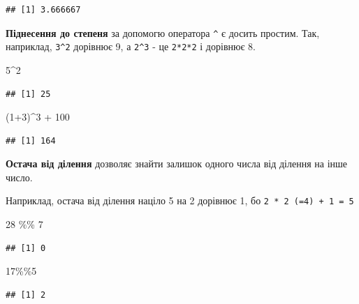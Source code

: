 \documentclass[
]{book}
\newenvironment{Shaded}{\begin{snugshade}}{\end{snugshade}}
\newcommand{\DecValTok}[1]{\textcolor[rgb]{0.00,0.00,0.81}{#1}}
\newcommand{\NormalTok}[1]{#1}
\newcommand{\SpecialCharTok}[1]{\textcolor[rgb]{0.00,0.00,0.00}{#1}}
\begin{document}
\begin{verbatim}
## [1] 3.666667
\end{verbatim}

\textbf{Піднесення до степеня} за допомогю оператора \texttt{\^{}} є досить простим. Так, наприклад, \texttt{3\^{}2} дорівнює 9, а \texttt{2\^{}3} - це \texttt{2*2*2} і дорівнює 8.

\begin{Shaded}
\begin{Highlighting}[]
\DecValTok{5}\SpecialCharTok{\^{}}\DecValTok{2}
\end{Highlighting}
\end{Shaded}

\begin{verbatim}
## [1] 25
\end{verbatim}

\begin{Shaded}
\begin{Highlighting}[]
\NormalTok{(}\DecValTok{1}\SpecialCharTok{+}\DecValTok{3}\NormalTok{)}\SpecialCharTok{\^{}}\DecValTok{3} \SpecialCharTok{+} \DecValTok{100} 
\end{Highlighting}
\end{Shaded}

\begin{verbatim}
## [1] 164
\end{verbatim}

\textbf{Остача від ділення} дозволяє знайти залишок одного числа від ділення на інше число.

Наприклад, остача від ділення націло 5 на 2 дорівнює 1, бо \texttt{2\ *\ 2\ (=4)\ +\ 1\ =\ 5}

\begin{Shaded}
\begin{Highlighting}[]
\DecValTok{28} \SpecialCharTok{\%\%} \DecValTok{7}
\end{Highlighting}
\end{Shaded}

\begin{verbatim}
## [1] 0
\end{verbatim}

\begin{Shaded}
\begin{Highlighting}[]
\DecValTok{17}\SpecialCharTok{\%\%}\DecValTok{5}
\end{Highlighting}
\end{Shaded}

\begin{verbatim}
## [1] 2
\end{verbatim}
\end{document}
